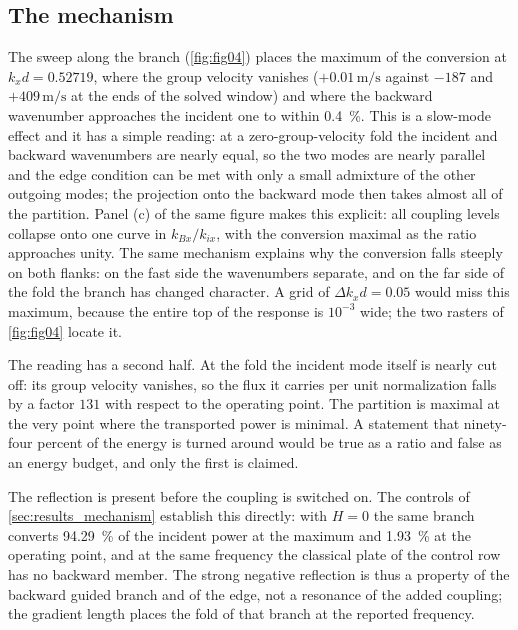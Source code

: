 \subsection{The mechanism}
\label{sec:disc_mechanism}

The sweep along the branch (\cref{fig:fig04}) places the maximum of the
conversion at $k_xd=0.52719$, where the group velocity vanishes
($+0.01\,\si{\metre\per\second}$ against $-187$ and $+409\,\si{\metre\per\second}$
at the ends of the solved window) and where the backward wavenumber approaches
the incident one to within \SI{0.4}{\percent}.  This is a slow-mode effect and
it has a simple reading: at a zero-group-velocity fold the incident and backward
wavenumbers are nearly equal, so the two modes are nearly parallel and the edge
condition can be met with only a small admixture of the other outgoing modes;
the projection onto the backward mode then takes almost all of the partition.
Panel (c) of the same figure makes this explicit: all coupling levels collapse
onto one curve in $k_{Bx}/k_{ix}$, with the conversion maximal as the ratio
approaches unity.  The same mechanism explains why the conversion falls steeply
on both flanks: on the fast side the wavenumbers separate, and on the far side of
the fold the branch has changed character.  A grid of $\Delta k_xd=0.05$ would miss this maximum, because the entire top of the response is $10^{-3}$ wide; the two rasters of \cref{fig:fig04} locate it.

The reading has a second half.  At the fold the incident
mode itself is nearly cut off: its group velocity vanishes, so the flux it
carries per unit normalization falls by a factor $131$ with respect to the
operating point.  The partition is maximal at the very point where the transported power is minimal.  A statement that ninety-four percent of the energy is turned around
would be true as a ratio and false as an energy budget, and only the first is claimed.

The reflection is present before the coupling is switched on.  The
controls of \cref{sec:results_mechanism} establish this directly: with $H=0$ the
same branch converts \SI{94.29}{\percent} of the incident power at the
maximum and \SI{1.93}{\percent} at the operating point, and at the same
frequency the classical plate of the control row has no backward member.  The strong negative reflection is thus a property of the backward guided branch and of the edge,
not a resonance of the added coupling; the gradient length places the fold of
that branch at the reported frequency.

